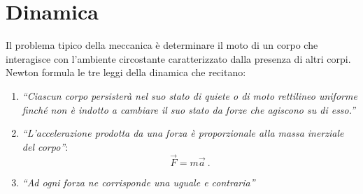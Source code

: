 \documentclass[12pt, oneside]{book}
\begin{document}
\chapter{Dinamica}
Il problema tipico della meccanica è determinare il moto di un corpo che interagisce con l'ambiente circostante caratterizzato dalla presenza di altri corpi. Newton formula le tre leggi della dinamica che recitano:
\begin{enumerate}
\item \textit{``Ciascun corpo persisterà nel suo stato di quiete o di moto rettilineo uniforme finché non è indotto a cambiare il suo stato da forze che agiscono su di esso.''}
\item \textit{``L'accelerazione prodotta da una forza è proporzionale alla massa inerziale del corpo''}:
\[\vec F = m\vec a~.\]
\item \textit{``Ad ogni forza ne corrisponde una uguale e contraria''}

\end{enumerate}
\end{document}

